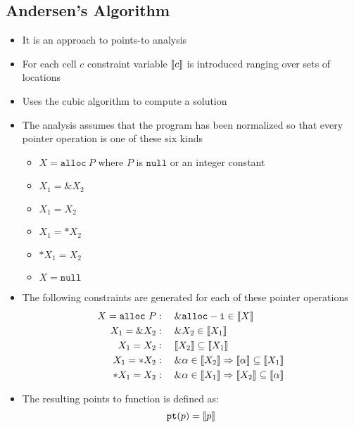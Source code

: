 \subsection{Andersen's Algorithm}
\begin{itemize}
  \item It is an approach to points-to analysis
  \item For each cell $c$ constraint variable $\left\llbracket c\right\rrbracket$ is introduced ranging over sets of locations
  \item Uses the cubic algorithm to compute a solution
  \item The analysis assumes that the program has been normalized so that every pointer operation is one of these six kinds
  \begin{itemize}
  	\item $X = \mathtt{alloc}~P$ where $P$ is $\mathtt{null}$ or an integer constant
  	\item $X_1 = \& X_2$
  	\item $X_1 = X_2$
  	\item $X_1 = * X_2$
  	\item $*X_1 = X_2$
  	\item $X = \mathtt{null}$
  \end{itemize}
  \item The following constraints are generated for each of these pointer operations
  \begin{align*} 
    X = \mathtt{alloc} \ P &: \quad  \& \mathtt{alloc-i} \in \left\llbracket X\right\rrbracket \\
    X_1 = \&X_2 &: \quad  \& X_2 \in \left\llbracket X_1\right\rrbracket \\
    X_1 = X_2 &: \quad \left\llbracket X_2\right\rrbracket \subseteq \left\llbracket X_1\right\rrbracket \\
    X_1 = *X_2 &: \quad \&\alpha \in \left\llbracket X_2\right\rrbracket \Rightarrow \left\llbracket\alpha\right\rrbracket \subseteq \left\llbracket X_1\right\rrbracket \\
    *X_1 = X_2 &: \quad \& \alpha \in \left\llbracket X_1\right\rrbracket \Rightarrow \left\llbracket X_2\right\rrbracket \subseteq \left\llbracket\alpha\right\rrbracket
  \end{align*}
  \item The resulting points to function is defined as:
  \begin{equation*}
    \mathtt{pt}(p) = \left\llbracket p\right\rrbracket
  \end{equation*}	
\end{itemize}

